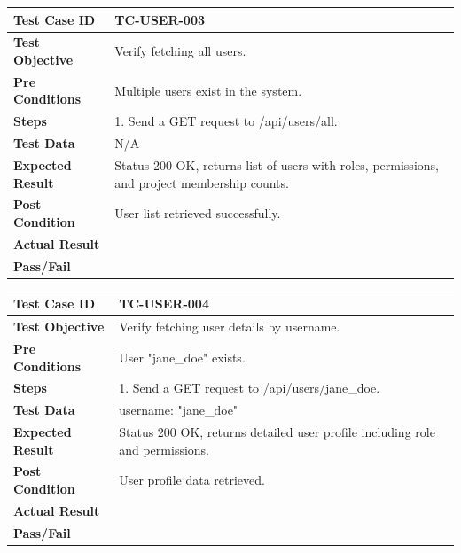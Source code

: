 \begin{longtable}{|p{}|p{}|}
\hline
\textbf{Test Case ID} & TC-USER-003 \\ \hline
\textbf{Test Objective} & Verify fetching all users. \\ \hline
\textbf{Pre Conditions} & Multiple users exist in the system. \\ \hline
\textbf{Steps} & 
1. Send a GET request to /api/users/all. \\ \hline
\textbf{Test Data} & N/A \\ \hline
\textbf{Expected Result} & Status 200 OK, returns list of users with roles, permissions, and project membership counts. \\ \hline
\textbf{Post Condition} & User list retrieved successfully. \\ \hline
\textbf{Actual Result} &  \\ \hline
\textbf{Pass/Fail} &  \\ \hline
\end{longtable}

\begin{longtable}{|p{}|p{}|}
\hline
\textbf{Test Case ID} & TC-USER-004 \\ \hline
\textbf{Test Objective} & Verify fetching user details by username. \\ \hline
\textbf{Pre Conditions} & User "jane\_doe" exists. \\ \hline
\textbf{Steps} & 
1. Send a GET request to /api/users/jane\_doe. \\ \hline
\textbf{Test Data} & username: "jane\_doe" \\ \hline
\textbf{Expected Result} & Status 200 OK, returns detailed user profile including role and permissions. \\ \hline
\textbf{Post Condition} & User profile data retrieved. \\ \hline
\textbf{Actual Result} &  \\ \hline
\textbf{Pass/Fail} &  \\ \hline
\end{longtable}

